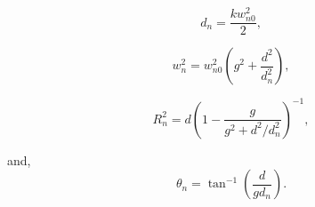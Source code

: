 \documentclass[%
 reprint,
amsmath,
amssymb,
10pt
]{revtex4-2}
\begin{document}
\begin{equation*}
    d_n = \frac{kw_{n0}^2}{2},
    \label{eq:dn}
\end{equation*}

\begin{equation*}
    w_n^2 = w_{n0}^2\left(g^2 + \frac{d^2}{d_n^2}\right),
    \label{eq:wn}
\end{equation*}

\begin{equation*}
    R_n^2 = d\left(1 - \frac{g}{g^2 + d^2 / d_n^2}\right)^{-1},
    \label{eq:Rn}
\end{equation*}

and,
\begin{equation*}
    \theta_n = \tan^{-1}\left(\frac{d}{g d_n}\right).
    \label{eq:thetan}
\end{equation*}
\end{document}

